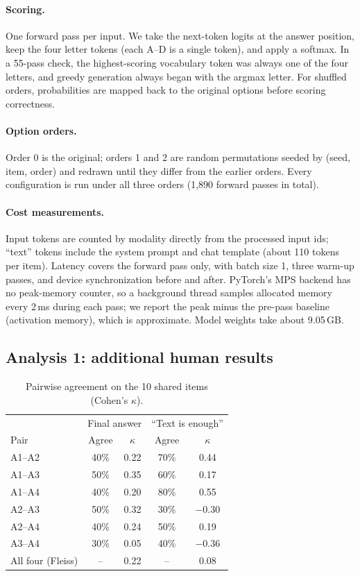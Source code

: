 \paragraph{Scoring.} One forward pass per input. We take the next-token logits
at the answer position, keep the four letter tokens (each A--D is a single
token), and apply a softmax. In a 55-pass check, the highest-scoring vocabulary
token was always one of the four letters, and greedy generation always began
with the argmax letter. For shuffled orders, probabilities are mapped back to the
original options before scoring correctness.

\paragraph{Option orders.} Order 0 is the original; orders 1 and 2 are random
permutations seeded by (seed, item, order) and redrawn until they differ from the
earlier orders. Every configuration is run under all three orders (1,890 forward
passes in total).

\paragraph{Cost measurements.} Input tokens are counted by modality directly
from the processed input ids; ``text'' tokens include the system prompt and chat
template (about 110 tokens per item). Latency covers the forward pass only, with
batch size 1, three warm-up passes, and device synchronization before and after.
PyTorch's MPS backend has no peak-memory counter, so a background thread samples
allocated memory every 2\,ms during each pass; we report the peak minus the
pre-pass baseline (activation memory), which is approximate. Model weights take
about 9.05\,GB.

\subsection{Analysis 1: additional human results}
\label{app:a1}

\begin{table}[h]
\caption{Pairwise agreement on the 10 shared items (Cohen's $\kappa$).}
\label{tab:app-pairs}
\centering\small
\begin{tabular}{lcccc}
\toprule
 & \multicolumn{2}{c}{Final answer} & \multicolumn{2}{c}{``Text is enough''} \\
Pair & Agree & $\kappa$ & Agree & $\kappa$ \\
\midrule
A1--A2 & 40\% & 0.22 & 70\% & 0.44 \\
A1--A3 & 50\% & 0.35 & 60\% & 0.17 \\
A1--A4 & 40\% & 0.20 & 80\% & 0.55 \\
A2--A3 & 50\% & 0.32 & 30\% & $-0.30$ \\
A2--A4 & 40\% & 0.24 & 50\% & 0.19 \\
A3--A4 & 30\% & 0.05 & 40\% & $-0.36$ \\
\midrule
All four (Fleiss) & -- & 0.22 & -- & 0.08 \\
\bottomrule
\end{tabular}
\end{table}


